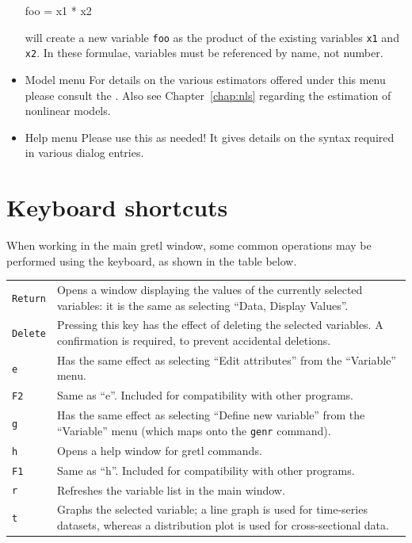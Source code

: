 \begin{itemize}
\begin{code} 
foo = x1 * x2
\end{code}

  will create a new variable \verb+foo+ as the product of the existing
  variables \verb+x1+ and \verb+x2+.  In these formulae, variables
  must be referenced by name, not number.

\item \textsf{Model menu} For details on the various estimators
  offered under this menu please consult the \GCR.  Also see
  Chapter~\ref{chap:nls} regarding the estimation of nonlinear models.

\item \textsf{Help menu} Please use this as needed! It gives details
  on the syntax required in various dialog entries.
\end{itemize}


\section{Keyboard shortcuts}
\label{keyb-accel}

When working in the main gretl window, some common operations
may be performed using the keyboard, as shown in the table below.

\begin{center}
\begin{tabular}{lp{5in}}
  \texttt{Return} & Opens a window displaying the values of the currently
  selected variables: it is the same as selecting ``Data, Display
  Values''. \\
  \texttt{Delete} & Pressing this key has the effect of deleting the
  selected variables. A confirmation is required, to prevent
  accidental deletions. \\
  \texttt{e} & Has the same effect as selecting ``Edit
  attributes'' from the ``Variable'' menu. \\
  \texttt{F2} & Same as ``e''. Included for compatibility with other
  programs.\\
  \texttt{g} & Has the same effect as selecting ``Define new
  variable'' from the ``Variable'' menu (which maps onto the
  \texttt{genr} command).\\
  \texttt{h} & Opens a help window for gretl commands.\\
  \texttt{F1} & Same as ``h''. Included for compatibility with other
  programs.\\
  \texttt{r} & Refreshes the variable list in the main window. \\
  \texttt{t} & Graphs the selected variable; a line graph is used for
  time-series datasets, whereas a distribution plot is used for
  cross-sectional data. 
\end{tabular}
\end{center}


